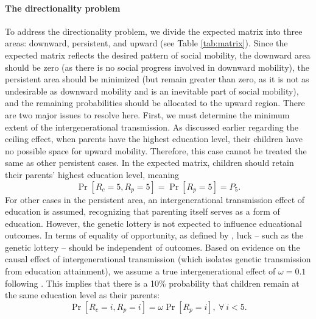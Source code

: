 \paragraph{The directionality problem}
To address the directionality problem, we divide the expected matrix into three areas: downward, persistent, and upward (see Table \ref{tab:matrix}). Since the expected matrix reflects the desired pattern of social mobility, the downward area should be zero (as there is no social progress involved in downward mobility), the persistent area should be minimized (but remain greater than zero, as it is not as undesirable as downward mobility and is an inevitable part of social mobility), and the remaining probabilities should be allocated to the upward region. There are two major issues to resolve here. First, we must determine the minimum extent of the intergenerational transmission. As discussed earlier regarding the ceiling effect, when parents have the highest education level, their children have no possible space for upward mobility. Therefore, this case cannot be treated the same as other persistent cases. In the expected matrix, children should retain their parents' highest education level, meaning  
\[
\operatorname{Pr}[R_c=5, R_p=5]=\operatorname{Pr}[R_p=5]=P_5.
\]
For other cases in the persistent area, an intergenerational transmission effect of education is assumed, recognizing that parenting itself serves as a form of education. However, the genetic lottery is not expected to influence educational outcomes. In terms of equality of opportunity, as defined by \citet{roemer2015equality}, luck -- such as the genetic lottery -- should be independent of outcomes. Based on evidence on the causal effect of intergenerational transmission (which isolates genetic transmission from education attainment), we assume a true intergenerational effect of \(\omega=0.1\) following \citet{holmlund2011causal}. This implies that there is a 10\% probability that children remain at the same education level as their parents:  
\[
\operatorname{Pr}[ R_{c} =i, R_{p} =i] =\omega \operatorname{Pr}[ R_{p} =i],\ \forall \ i< 5.
\]


